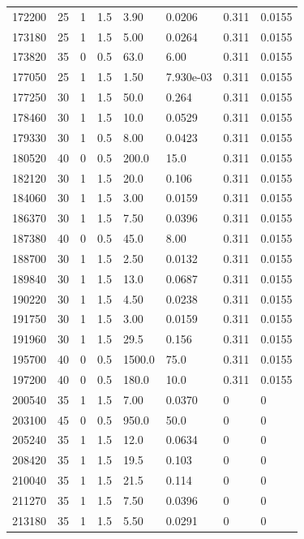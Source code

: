\documentclass[preview]{standalone}
\begin{document}
{{{{{\begin{tabular}{L{1.2cm}C{1.2cm} C{0.3cm}C{0.5cm} C{1.4cm}C{1.4cm} C{1.4cm}C{1.4cm}}
  172200  &    25  & 1     & 1.5 &  3.90  & 0.0206  & 0.311 &  0.0155   \\ 
  173180  &    25  & 1     & 1.5 &  5.00  & 0.0264  & 0.311 &  0.0155   \\ 
  173820  &    35  & 0     & 0.5 &  63.0  & 6.00  & 0.311 &  0.0155   \\ 
  177050  &    25  & 1     & 1.5 &  1.50  & 7.930e-03  & 0.311 &  0.0155   \\ 
  177250  &    30  & 1     & 1.5 &  50.0  & 0.264  & 0.311 &  0.0155   \\ 
  178460  &    30  & 1     & 1.5 &  10.0  & 0.0529  & 0.311 &  0.0155   \\ 
  179330  &    30  & 1     & 0.5 &  8.00  & 0.0423  & 0.311 &  0.0155   \\ 
  180520  &    40  & 0     & 0.5 &  200.0  & 15.0  & 0.311 &  0.0155   \\ 
  182120  &    30  & 1     & 1.5 &  20.0  & 0.106  & 0.311 &  0.0155   \\ 
  184060  &    30  & 1     & 1.5 &  3.00  & 0.0159  & 0.311 &  0.0155   \\ 
  186370  &    30  & 1     & 1.5 &  7.50  & 0.0396  & 0.311 &  0.0155   \\ 
  187380  &    40  & 0     & 0.5 &  45.0  & 8.00  & 0.311 &  0.0155   \\ 
  188700  &    30  & 1     & 1.5 &  2.50  & 0.0132  & 0.311 &  0.0155   \\ 
  189840  &    30  & 1     & 1.5 &  13.0  & 0.0687  & 0.311 &  0.0155   \\ 
  190220  &    30  & 1     & 1.5 &  4.50  & 0.0238  & 0.311 &  0.0155   \\ 
  191750  &    30  & 1     & 1.5 &  3.00  & 0.0159  & 0.311 &  0.0155   \\ 
  191960  &    30  & 1     & 1.5 &  29.5  & 0.156  & 0.311 &  0.0155   \\ 
  195700  &    40  & 0     & 0.5 &  1500.0  & 75.0  & 0.311 &  0.0155   \\ 
  197200  &    40  & 0     & 0.5 &  180.0  & 10.0  & 0.311 &  0.0155   \\ 
  200540  &    35  & 1     & 1.5 &  7.00  & 0.0370  & 0 &  0   \\ 
  203100  &    45  & 0     & 0.5 &  950.0  & 50.0  & 0 &  0   \\ 
  205240  &    35  & 1     & 1.5 &  12.0  & 0.0634  & 0 &  0   \\ 
  208420  &    35  & 1     & 1.5 &  19.5  & 0.103  & 0 &  0   \\ 
  210040  &    35  & 1     & 1.5 &  21.5  & 0.114  & 0 &  0   \\ 
  211270  &    35  & 1     & 1.5 &  7.50  & 0.0396  & 0 &  0   \\ 
  213180  &    35  & 1     & 1.5 &  5.50  & 0.0291  & 0 &  0   \\ 
\hline 
\end{tabular} 

}}}}}
\end{document}
